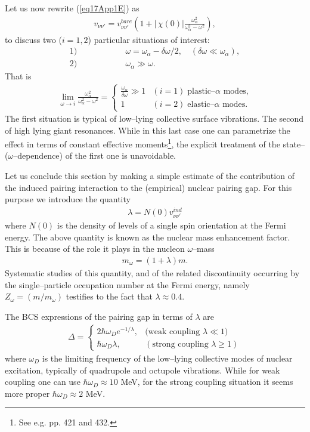 \begin{subappendices}
Let us now rewrite (\ref{eq17App1E}) as
\begin{align}
v_{\nu\nu'}=v_{\nu\nu'}^{bare}\left(1+|\,\chi(0)|\frac{\omega_\alpha^2}{\omega^2_\alpha-\omega^2}\right),
\end{align}
to discuss two ($i=1,2$) particular situations of interest:
   \begin{align}
1)&\quad\quad\quad\quad\quad \omega=\omega_\alpha-\delta\omega/2,\quad(\delta\omega\ll\omega_\alpha),\\
2)&\quad\quad\quad\quad\quad \omega_\alpha\gg\omega.
   \end{align}
That is
\begin{align}
\lim_{\omega\rightarrow i} \frac{\omega_\alpha^2}{\omega^2_\alpha-\omega^2}=\left\{\begin{array}{ll}
 \frac{\omega_\alpha}{\delta \omega}\gg1&(i=1)\;\text{plastic--} \alpha\text{ modes,}\\ 
 1&(i=2)\;\text{elastic--} \alpha\text{ modes.}
\end{array}
\right. 
\end{align}
The first situation is typical of low--lying collective surface vibrations. The second of high lying giant resonances. While in this last case one can parametrize the effect in terms of constant effective moments\footnote{See e.g. \cite{Bohr:75} pp. 421 and 432.}, the explicit treatment of the state-- ($\omega$--dependence) of the first one is unavoidable.


Let us conclude this section by making a simple estimate of the contribution of the induced pairing interaction to the (empirical) nuclear pairing gap. For this purpose we introduce the quantity
 \begin{align}
\lambda=N(0)v_{\nu\nu'}^{ind}
 \end{align}
where $N(0)$ is the density of levels of a single spin orientation at the Fermi energy. The above quantity is known as the nuclear mass enhancement factor. This is because of the role it plays in the nucleon $\omega$--mass
 \begin{align}
m_\omega=(1+\lambda)m.
 \end{align}
Systematic studies of this quantity, and of the related discontinuity occurring by the single--particle occupation number at the Fermi energy, namely $Z_\omega=(m/m_\omega)$ testifies to the fact that $\lambda\approx0.4$.


The BCS expressions of the pairing gap in terms of $\lambda$ are
\begin{align}\label{eq24App3E}
\Delta=\left\{\begin{array}{ll}
2\hbar\omega_De^{-1/\lambda},&\text{(weak coupling } \lambda\ll1)\\ 
\hbar\omega_D\lambda,&(\text{strong coupling }\lambda\geq1)
\end{array}
\right. 
\end{align}
where $\omega_D$ is the limiting frequency of the low--lying collective modes of nuclear excitation, typically of quadrupole and octupole vibrations. While for weak coupling one can use $\hbar\omega_D\approx10$ MeV, for the strong coupling situation it seems more proper $\hbar\omega_D\approx 2$ MeV.



\end{subappendices}
